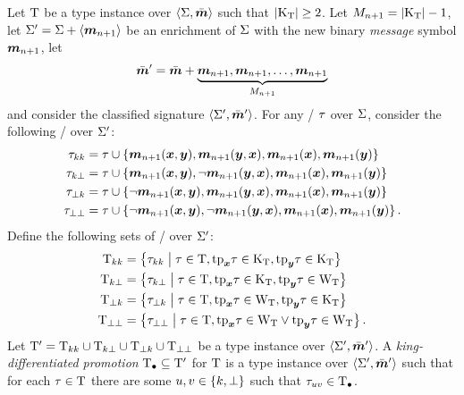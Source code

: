 \begin{definition}
Let $\TI$ be a type instance over $\ClSig\SigS\sms$ such that
$\card{\TK\TI}\geq2$.
Let $\nM_{\nn+1} = \card{\TK\TI}-1$,
let $\SigSp = \SigS + \seq{\smm{\nn+1}}$ be an enrichment of $\SigS$ with the
new binary \emph{message} symbol $\smm{\nn+1}$, let
\[
\sms' = \sms +
\underbrace{\smm{\nn+1},\smm{\nn+1},\dots,\smm{\nn+1}}_{\nMM{\nn+1}}
\]
and consider the classified signature $\ClSig\SigSp\smsp$.
For any \twotype/ $\tpt$ over $\SigS$, consider the following \twotypes/ over
$\SigSp$:
\begin{align*}
\mrr\tpt\kk\kk &=
\tpt\cup\set{\smm{\nn+1}(\xx,\yy),\smm{\nn+1}(\yy,\xx),
\smm{\nn+1}(\xx),\smm{\nn+1}(\yy)} \\
\mrr\tpt\kk\bot &=
\tpt\cup\set{\smm{\nn+1}(\xx,\yy),\lnot\smm{\nn+1}(\yy,\xx),
\smm{\nn+1}(\xx),\smm{\nn+1}(\yy)} \\
\mrr\tpt\bot\kk &=
\tpt\cup\set{\lnot\smm{\nn+1}(\xx,\yy),\smm{\nn+1}(\yy,\xx),
\smm{\nn+1}(\xx),\smm{\nn+1}(\yy)} \\
\mrr\tpt\bot\bot &=
\tpt\cup\set{\lnot\smm{\nn+1}(\xx,\yy),\lnot\smm{\nn+1}(\yy,\xx),
\smm{\nn+1}(\xx),\smm{\nn+1}(\yy)}.
\end{align*}
Define the following sets of \twotypes/ over $\SigSp$:
\begin{align*}
\mrr\TI\kk\kk &=
\setbd{\mrr\tpt\kk\kk}{\tpt\in\TI,\tpx\tpt\in\TK\TI,\tpy\tpt\in\TK\TI} \\
\mrr\TI\kk\bot &=
\setbd{\mrr\tpt\kk\bot}{\tpt\in\TI,\tpx\tpt\in\TK\TI,\tpy\tpt\in\TW\TI} \\
\mrr\TI\bot\kk &=
\setbd{\mrr\tpt\bot\kk}{\tpt\in\TI,\tpx\tpt\in\TW\TI,\tpy\tpt\in\TK\TI} \\
\mrr\TI\bot\bot &=
\setbd{\mrr\tpt\bot\bot}{\tpt\in\TI,\tpx\tpt\in\TW\TI\lor\tpy\tpt\in\TW\TI}.
\end{align*}
Let $\TI' =
\mrr\TI\kk\kk\cup\mrr\TI\kk\bot\cup\mrr\TI\bot\kk\cup\mrr\TI\bot\bot$ be a type
instance over $\ClSig\SigSp\smsp$.
A \emph{king-differentiated promotion} $\TIp\subseteq\TI'$ for $\TI$ is a type
instance over $\ClSig\SigSp\smsp$ such that for each $\tpt\in\TI$ there are some
$u,v\in\set{\kk,\bot}$ such that $\mrr\tpt{u}{v}\in\TIp$.
\end{definition}

